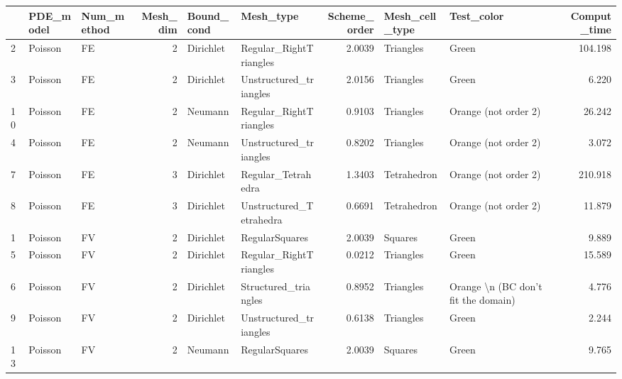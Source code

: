 \begin{tabular}{lllrllrllr}
\toprule
{} & PDE\_model & Num\_method &  Mesh\_dim & Bound\_cond &                Mesh\_type &  Scheme\_order & Mesh\_cell\_type &                                  Test\_color &  Comput\_time \\
\midrule
2  &   Poisson &         FE &         2 &  Dirichlet &   Regular\_RightTriangles &        2.0039 &      Triangles &                                       Green &      104.198 \\
3  &   Poisson &         FE &         2 &  Dirichlet &   Unstructured\_triangles &        2.0156 &      Triangles &                                       Green &        6.220 \\
10 &   Poisson &         FE &         2 &    Neumann &   Regular\_RightTriangles &        0.9103 &      Triangles &                        Orange (not order 2) &       26.242 \\
4  &   Poisson &         FE &         2 &    Neumann &   Unstructured\_triangles &        0.8202 &      Triangles &                        Orange (not order 2) &        3.072 \\
7  &   Poisson &         FE &         3 &  Dirichlet &       Regular\_Tetrahedra &        1.3403 &    Tetrahedron &                        Orange (not order 2) &      210.918 \\
8  &   Poisson &         FE &         3 &  Dirichlet &  Unstructured\_Tetrahedra &        0.6691 &    Tetrahedron &                        Orange (not order 2) &       11.879 \\
1  &   Poisson &         FV &         2 &  Dirichlet &           RegularSquares &        2.0039 &        Squares &                                       Green &        9.889 \\
5  &   Poisson &         FV &         2 &  Dirichlet &   Regular\_RightTriangles &        0.0212 &      Triangles &                                       Green &       15.589 \\
6  &   Poisson &         FV &         2 &  Dirichlet &     Structured\_triangles &        0.8952 &      Triangles &         Orange \textbackslash n (BC don't fit the domain) &        4.776 \\
9  &   Poisson &         FV &         2 &  Dirichlet &   Unstructured\_triangles &        0.6138 &      Triangles &                                       Green &        2.244 \\
13 &   Poisson &         FV &         2 &    Neumann &           RegularSquares &        2.0039 &        Squares &                                       Green &        9.765 \\

\end{tabular}

